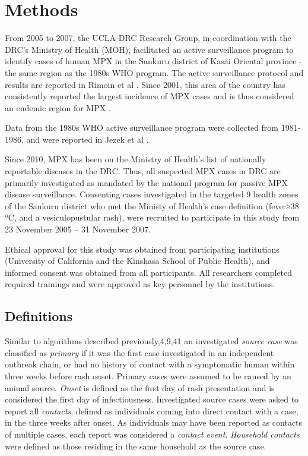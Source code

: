 \section{Methods}

From 2005 to 2007, the UCLA-DRC Research Group, in coordination with the DRC’s Ministry of Health (MOH), facilitated an active surveillance program to identify cases of human MPX in the Sankuru district of Kasai Oriental province - the same region as the 1980s WHO program. The active surveillance protocol and results are reported in Rimoin et al \cite{Rimoin2010}. Since 2001, this area of the country has consistently reported the largest incidence of MPX cases and is thus considered an endemic region for MPX \cite{Rimoin2010}. 

Data from the 1980s WHO active surveillance program were collected from 1981-1986, and were reported in Jezek et al \cite{Jezek1988}.

Since 2010, MPX has been on the Ministry of Health's list of nationally reportable diseases in the DRC. Thus, all suspected MPX cases in DRC are primarily investigated as mandated by the national program for passive MPX disease surveillance. Consenting cases investigated in the targeted 9 health zones of the Sankuru district who met the  Ministy of Health’s case definition (fever≥38 ºC, and a vesiculopustular rash), were recruited to participate in this study from 23 November 2005 – 31 November 2007. 

Ethical approval for this study was obtained from participating institutions (University of California and the Kinshasa School of Public Health), and informed consent was obtained from all participants. All researchers completed required trainings and were approved as key personnel by the institutions. 

\subsection{Definitions}
Similar to algorithms described previously,4,9,41 an investigated \textit{source case} was classified as \textit{primary} if it was the first case investigated in an independent outbreak chain, or had no history of contact with a symptomatic human within three weeks before rash onset. Primary cases were assumed to be caused by an animal source. \textit{Onset} is defined as the first day of rash presentation and is considered the first day of infectiousness. Investigated source cases were asked to report all \textit{contacts}, defined as individuals coming into direct contact with a case, in the three weeks after onset. As individuals may have been reported as contacts of multiple cases, each report was considered a \textit{contact event}. \textit{Household contacts} were defined as those residing in the same household as the source case.


